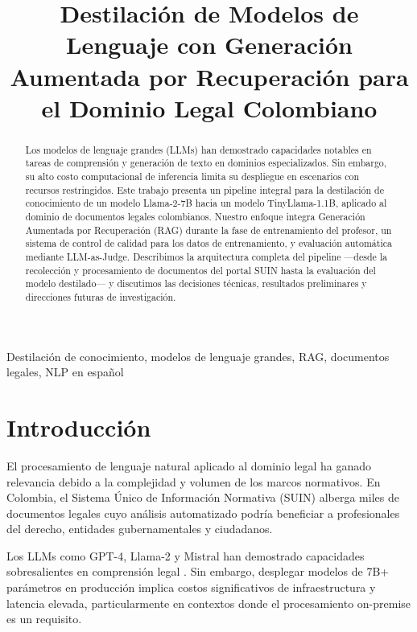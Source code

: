 \documentclass[conference]{IEEEtran}
\title{Destilaci\'on de Modelos de Lenguaje con Generaci\'on Aumentada por Recuperaci\'on para el Dominio Legal Colombiano}
\author{
\IEEEauthorblockN{Equipo de Investigaci\'on}
\IEEEauthorblockA{
Universidad \\
Departamento de Ingenier\'ia de Sistemas \\
Colombia}
}
\begin{document}
\maketitle

\begin{abstract}
Los modelos de lenguaje grandes (LLMs) han demostrado capacidades notables en tareas de comprensi\'on y generaci\'on de texto en dominios especializados. Sin embargo, su alto costo computacional de inferencia limita su despliegue en escenarios con recursos restringidos. Este trabajo presenta un pipeline integral para la destilaci\'on de conocimiento de un modelo Llama-2-7B hacia un modelo TinyLlama-1.1B, aplicado al dominio de documentos legales colombianos. Nuestro enfoque integra Generaci\'on Aumentada por Recuperaci\'on (RAG) durante la fase de entrenamiento del profesor, un sistema de control de calidad para los datos de entrenamiento, y evaluaci\'on autom\'atica mediante LLM-as-Judge. Describimos la arquitectura completa del pipeline ---desde la recolecci\'on y procesamiento de documentos del portal SUIN hasta la evaluaci\'on del modelo destilado--- y discutimos las decisiones t\'ecnicas, resultados preliminares y direcciones futuras de investigaci\'on.
\end{abstract}

\begin{IEEEkeywords}
Destilaci\'on de conocimiento, modelos de lenguaje grandes, RAG, documentos legales, NLP en espa\~nol
\end{IEEEkeywords}

\section{Introducci\'on}
\label{sec:intro}

El procesamiento de lenguaje natural aplicado al dominio legal ha ganado relevancia debido a la complejidad y volumen de los marcos normativos. En Colombia, el Sistema \'Unico de Informaci\'on Normativa (SUIN) alberga miles de documentos legales cuyo an\'alisis automatizado podr\'ia beneficiar a profesionales del derecho, entidades gubernamentales y ciudadanos.

Los LLMs como GPT-4, Llama-2 y Mistral han demostrado capacidades sobresalientes en comprensi\'on legal \cite{katz2024gpt4}. Sin embargo, desplegar modelos de 7B+ par\'ametros en producci\'on implica costos significativos de infraestructura y latencia elevada, particularmente en contextos donde el procesamiento on-premise es un requisito.
\end{document}
